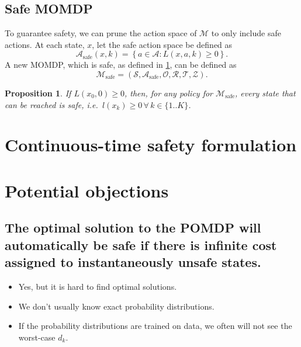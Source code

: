 \documentclass{article}
\newtheorem{prop}{Proposition}
\newcommand{\sspace}{\ensuremath{\mathcal{S}} }
\newcommand{\aspace}{\ensuremath{\mathcal{A}} }
\newcommand{\ospace}{\ensuremath{\mathcal{O}} }
\newcommand{\tdist}{\ensuremath{\mathcal{T}} }
\newcommand{\odist}{\ensuremath{\mathcal{Z}} }
\newcommand{\reward}{\ensuremath{\mathcal{R}} }
\begin{document}
\subsection{Safe MOMDP}

To guarantee safety, we can prune the action space of $\mathcal{M}$ to only include safe actions. At each state, $x$, let the safe action space be defined as
\begin{equation}
    \aspace_\text{safe}(x, k) = \left\{a \in \aspace : L(x,a,k) \geq 0 \right\} \text{.}
\end{equation}
A new MOMDP, which is safe, as defined in \cref{prop:safe}, can be defined as
\begin{equation}
    \mathcal{M}_\text{safe} = (\sspace, \aspace_\text{safe}, \ospace, \reward, \tdist, \odist) \text{.}
\end{equation}

\begin{prop}
    If $L(x_0, 0)\geq 0$, then, for any policy for $\mathcal{M}_\text{safe}$, every state that can be reached is safe, i.e.\ $l(x_k) \geq 0 \, \forall\, k \in \{1..K\}$.
    \label{prop:safe}
\end{prop}

\section{Continuous-time safety formulation}


\section{Potential objections}

\subsection{The optimal solution to the POMDP will automatically be safe if there is infinite cost assigned to instantaneously unsafe states.}

\begin{itemize}
    \item Yes, but it is hard to find optimal solutions.
    \item We don't usually know exact probability distributions.
    \item If the probability distributions are trained on data, we often will not see the worst-case $d_k$.
\end{itemize}
\end{document}
